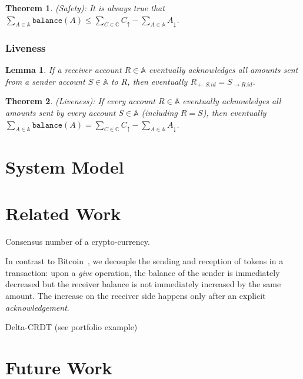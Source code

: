 \documentclass[9pt, oneside]{article}   	%
\newtheorem{theorem}{Theorem}
\newtheorem{lemma}{Lemma}
\begin{document}
\begin{theorem}
(Safety): It is always true that $\sum\limits_{A \in \mathds{A}} \texttt{balance}(A) \leq  \sum\limits_{C \in \mathds{C}} C_\uparrow - \sum\limits_{A \in \mathds{A}} A_\downarrow$.
\end{theorem}


\subsubsection{Liveness}

\begin{lemma}
If a receiver account $R \in \mathds{A}$ eventually acknowledges all amounts sent from a sender account $S \in \mathds{A}$ to $R$, then eventually $R_{\leftarrow S.id} = S_{\rightarrow R.id}$.
\end{lemma}

\begin{theorem}
(Liveness): If every account $R \in \mathds{A}$ eventually acknowledges all amounts sent by every account $S \in \mathds{A}$ (including $R=S$), then eventually $\sum\limits_{A \in \mathds{A}} \texttt{balance}(A) = \sum\limits_{C \in \mathds{C}} C_\uparrow - \sum\limits_{A \in \mathds{A}} A_\downarrow$.
\end{theorem}

\section{System Model}




\section{Related Work}

Consensus number of a crypto-currency.

 In contrast to Bitcoin~\cite{bitcoin}, we decouple the sending and reception of tokens in a transaction: upon a \textit{give} operation, the balance of the sender is immediately decreased but the receiver balance is not immediately increased by the same amount.  The increase on the receiver side happens only  after an explicit \textit{acknowledgement}. 
 
Delta-CRDT (see portfolio example)~\cite{Almeida2018delta}
 
\section{Future Work}
 
\end{document}
